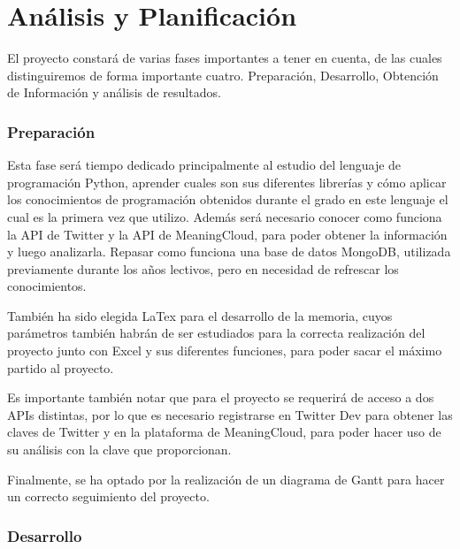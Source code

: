 
\chapter{Análisis y Planificación}

El proyecto constará de varias fases importantes a tener en cuenta, de las cuales distinguiremos de forma importante cuatro. Preparación, Desarrollo, Obtención de Información y análisis de resultados. 

\subsection{Preparación}

Esta fase será tiempo dedicado principalmente al estudio del lenguaje de programación Python, aprender cuales son sus diferentes librerías y cómo aplicar los conocimientos de programación obtenidos durante el grado en este lenguaje el cual es la primera vez que utilizo. Además será necesario conocer como funciona la API de Twitter y la API de MeaningCloud, para poder obtener la información y luego analizarla. Repasar como funciona una base de datos MongoDB, utilizada previamente durante los años lectivos, pero en necesidad de refrescar los conocimientos. 

También ha sido elegida LaTex para el desarrollo de la memoria, cuyos parámetros también habrán de ser estudiados para la correcta realización del proyecto junto con Excel y sus diferentes funciones, para poder sacar el máximo partido al proyecto. 

Es importante también notar que para el proyecto se requerirá de acceso a dos APIs distintas, por lo que es necesario registrarse en Twitter Dev para obtener las claves de Twitter y en la plataforma de MeaningCloud, para poder hacer uso de su análisis con la clave que proporcionan.

Finalmente, se ha optado por la realización de un diagrama de Gantt para hacer un correcto seguimiento del proyecto. 

\subsection{Desarrollo}

